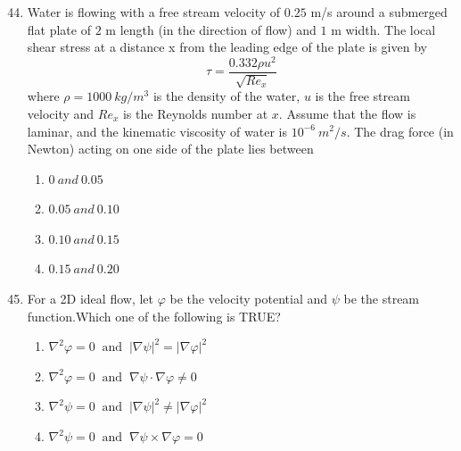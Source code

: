 \documentclass[journal]{IEEEtran}
\theoremstyle{remark}
\begin{document}
\newpage
\vspace*{0.25cm}

\begin{enumerate}[itemsep=1em]
\setcounter{enumi}{43}
\item 
Water is flowing with a free stream velocity of $0.25$ m/s around a submerged flat plate of $2$ m length (in the direction of flow) and $1$ m width. The local shear stress at a distance x from the leading edge of the plate is given by  
\[
\tau=\frac{0.332\rho u^2}{\sqrt{Re_x}}
\]
where $\rho= 1000 \ kg/m^3$ is the density of the water, $u$ is the free stream velocity and $Re_x$ is the Reynolds number at $x$. Assume that the flow is laminar, and the kinematic viscosity of water is $10^{-6}\  m^2/s$. The drag force (in Newton) acting on one side of the plate lies between  
\begin{multicols}{4}
\begin{enumerate}
    \item $0\ and\ 0.05$ 
    \item $0.05\ and\ 0.10$
    \item $0.10\ and\ 0.15$  
    \item $0.15\ and\ 0.20$  
\end{enumerate}
\end{multicols}
\end{enumerate}

\begin{enumerate}[itemsep=1em]
\setcounter{enumi}{44}
\item For a 2D ideal flow, let $\varphi$ be the velocity potential and $\psi$ be the stream function.Which one of the following is TRUE? 
\begin{enumerate}[leftmargin=2.5em, labelsep=0.5em, itemsep=0.5em]
    \item $\nabla^2 \varphi = 0 \;\; \text{and} \;\; |\nabla \psi|^2 = |\nabla \varphi|^2$
    \item $\nabla^2 \varphi = 0 \;\; \text{and} \;\; \nabla \psi \cdot \nabla \varphi \neq 0$
    \item $\nabla^2 \psi = 0 \;\; \text{and} \;\; |\nabla \psi|^2 \neq |\nabla \varphi|^2$
    \item $\nabla^2 \psi = 0 \;\; \text{and} \;\; \nabla \psi \times \nabla \varphi = 0$
\end{enumerate}
\end{enumerate}
\end{document}
